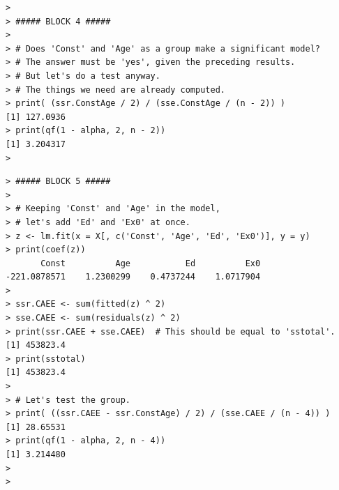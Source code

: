 \documentclass[12pt]{article}
\begin{document}
\begin{verbatim}
> 
> ##### BLOCK 4 #####
> 
> # Does 'Const' and 'Age' as a group make a significant model?
> # The answer must be 'yes', given the preceding results.
> # But let's do a test anyway.
> # The things we need are already computed.
> print( (ssr.ConstAge / 2) / (sse.ConstAge / (n - 2)) )
[1] 127.0936
> print(qf(1 - alpha, 2, n - 2))
[1] 3.204317
>
\end{verbatim}

\begin{verbatim}
> ##### BLOCK 5 #####
> 
> # Keeping 'Const' and 'Age' in the model,
> # let's add 'Ed' and 'Ex0' at once.
> z <- lm.fit(x = X[, c('Const', 'Age', 'Ed', 'Ex0')], y = y)
> print(coef(z))
       Const          Age           Ed          Ex0 
-221.0878571    1.2300299    0.4737244    1.0717904 
> 
> ssr.CAEE <- sum(fitted(z) ^ 2)
> sse.CAEE <- sum(residuals(z) ^ 2)
> print(ssr.CAEE + sse.CAEE)  # This should be equal to 'sstotal'.
[1] 453823.4
> print(sstotal)
[1] 453823.4
> 
> # Let's test the group.
> print( ((ssr.CAEE - ssr.ConstAge) / 2) / (sse.CAEE / (n - 4)) )
[1] 28.65531
> print(qf(1 - alpha, 2, n - 4))
[1] 3.214480
> 
> 
\end{verbatim}
\end{document}
